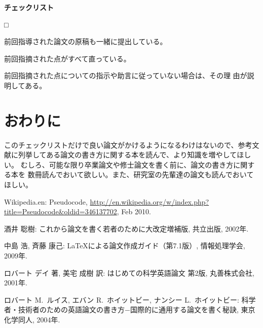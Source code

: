 \documentclass[11pt,a4j]{jsarticle}
\begin{document}
\begin{flushleft}
 {\bf チェックリスト}
\end{flushleft}
\begin{list}%
 {□} %
 {} %
 \item 前回指導された論文の原稿も一緒に提出している。
 \item 前回指摘された点がすべて直っている。
 \item 前回指摘された点についての指示や助言に従っていない場合は、その理
       由が説明してある。
 \end{list}

\section{おわりに}

このチェックリストだけで良い論文がかけるようになるわけはないので、参考文
献に列挙してある論文の書き方に関する本を読んで、より知識を増やしてほしい。
むしろ、可能な限り卒業論文や修士論文を書く前に、論文の書き方に関する本を
数冊読んでおいて欲しい。また、研究室の先輩達の論文も読んでおいてほしい。

\begin{thebibliography}{99}

Wikipedia.en: Pseudocode, 
	 \url{http://en.wikipedia.org/w/index.php?title=Pseudocode&oldid=346137702},
	 Feb 2010.

酒井 聡樹: これから論文を書く若者のために大改定増補版, 共立出版, 2002年.

中島 浩, 斉藤 康己: LaTeXによる論文作成ガイド（第7.1版）, 情報処理学会, 2009年.

ロバート デイ 著, 美宅 成樹 訳: はじめての科学英語論文 第2版, 丸善株式会社, 2001年.

ロバート M.\ ルイス, エバン R.\ ホイットビー, ナンシー L.\ ホイットビー:
	 科学者・技術者のための英語論文の書き方−国際的に通用する論文を書く秘訣, 東京化学同人, 2004年.
\end{thebibliography}
\end{document}
